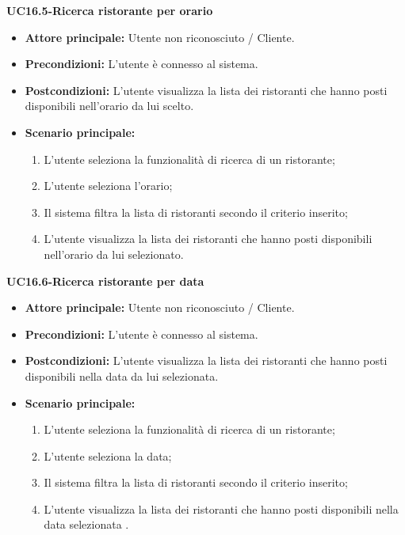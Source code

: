 \textbf{UC16.5-Ricerca ristorante per orario}
\begin{itemize}
\item \textbf{Attore principale: }Utente non riconosciuto / Cliente.
\item \textbf{Precondizioni:} L'utente è connesso al sistema.
\item \textbf{Postcondizioni:} L'utente visualizza la lista dei ristoranti che hanno posti disponibili nell'orario
da lui scelto.
\item \textbf{Scenario principale:}
\begin{enumerate}
    \item L'utente seleziona la funzionalità di ricerca di un ristorante;
    \item L'utente seleziona l'orario;
    \item Il sistema filtra la lista di ristoranti secondo il criterio inserito;
    \item L'utente visualizza la lista dei ristoranti che hanno posti disponibili nell'orario da lui
    selezionato.
\end{enumerate}
\end{itemize}

\textbf{UC16.6-Ricerca ristorante per data}
\begin{itemize}
\item \textbf{Attore principale:} Utente non riconosciuto / Cliente.
\item \textbf{Precondizioni:} L'utente è connesso al sistema.
\item \textbf{Postcondizioni:} L'utente visualizza la lista dei ristoranti che hanno posti disponibili
nella data da lui selezionata.
\item \textbf{Scenario principale:}
\begin{enumerate}
    \item L'utente seleziona la funzionalità di ricerca di un ristorante;
    \item L'utente seleziona la data;
    \item Il sistema filtra la lista di ristoranti secondo il criterio inserito;
    \item L'utente visualizza la lista dei ristoranti che hanno posti disponibili
    nella data selezionata .
\end{enumerate}
\end{itemize}

